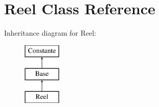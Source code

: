 \hypertarget{class_reel}{\section{Reel Class Reference}
\label{class_reel}
}
Inheritance diagram for Reel\-:\begin{figure}[H]
\begin{center}
\leavevmode
\includegraphics[height=3.000000cm]{class_reel}
\end{center}
\end{figure}
